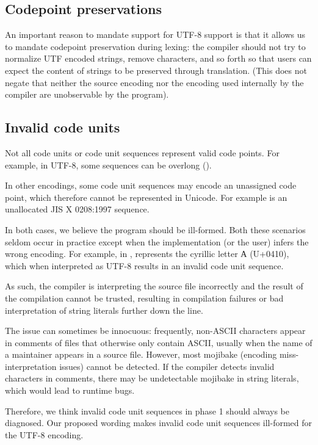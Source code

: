 \documentclass{wg21}
\begin{document}
\subsection{Codepoint preservations}

An important reason to mandate support for UTF-8 support is that it allows us to mandate codepoint preservation during lexing:
the compiler should not try to normalize UTF encoded strings, remove characters, and so forth so that users can expect the content
of strings to be preserved through translation.
(This does not negate that neither the source encoding nor the encoding used internally by the compiler are unobservable by the program).

\subsection{Invalid code units}

Not all code units or code unit sequences represent valid code points.
For example, in UTF-8, some sequences can be overlong ().

In other encodings, some code unit sequences may encode an unassigned code point, which therefore cannot be represented in Unicode.
For example  is an unallocated JIS X 0208:1997 sequence.

In both cases, we believe the program should be ill-formed.
Both these scenarios seldom occur in practice except when the implementation (or the user) infers the wrong encoding.
For example, in ,  represents the cyrillic letter А (U+0410), which when interpreted
as UTF-8 results in an invalid code unit sequence.

As such, the compiler is interpreting the source file incorrectly and the result of the compilation cannot be trusted,
resulting in compilation failures or bad interpretation of string literals further down the line.

The issue can sometimes be innocuous:
frequently, non-ASCII characters appear in comments of files that otherwise only contain ASCII, usually when the name of
a maintainer appears in a source file.
However, most mojibake (encoding miss-interpretation issues) cannot be detected. If the compiler detects invalid characters in comments, there may be undetectable
mojibake in string literals, which would lead to runtime bugs.

Therefore, we think invalid code unit sequences in phase 1 should always be diagnosed.
Our proposed wording makes invalid code unit sequences ill-formed for the UTF-8 encoding.
\end{document}
